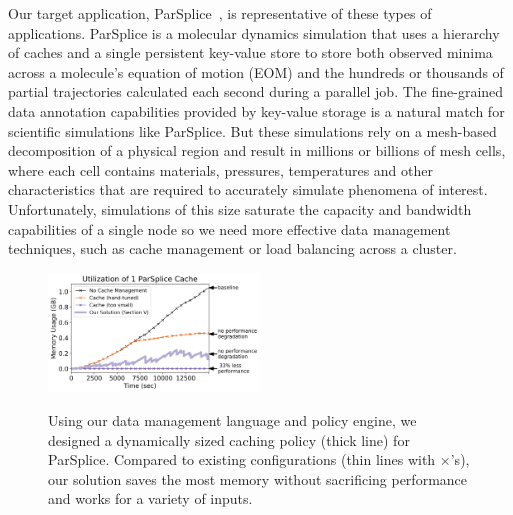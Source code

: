 Our target application, ParSplice~\cite{perez:jctc20150parsplice}, is
representative of these types of applications. ParSplice is a molecular
dynamics simulation that uses a hierarchy of caches and a single persistent
key-value store to store both observed minima across a molecule's equation of
motion (EOM) and the hundreds or thousands of partial trajectories calculated
each second during a parallel job.  The fine-grained data annotation
capabilities provided by key-value storage is a natural match for scientific
simulations like ParSplice. But these simulations rely on a mesh-based
decomposition of a physical region and result in millions or billions of mesh
cells, where each cell contains materials, pressures, temperatures and other
characteristics that are required to accurately simulate phenomena of interest.
Unfortunately, simulations of this size saturate the capacity and bandwidth
capabilities of a single node so we need more effective data management
techniques, such as cache management or load balancing across a cluster.

\begin{figure}[t]
\noindent\includegraphics[width=0.5\textwidth]{figures/cache-management.png}\\
\caption{Using our data management language and policy engine, we designed a
dynamically sized caching policy (thick line) for ParSplice.  Compared to
existing configurations (thin lines with \(\times\)'s), our solution saves the most
memory without sacrificing performance and works for a variety of inputs.
\label{fig:cache-management}}
\end{figure}

